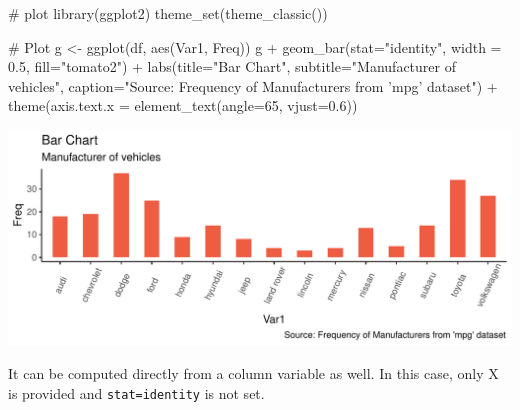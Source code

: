 \documentclass[a4paper]{article}
\newenvironment{Shaded}{}{}
\newcommand{\KeywordTok}[1]{\textcolor[rgb]{0.00,0.00,1.00}{#1}}
\newcommand{\DataTypeTok}[1]{#1}
\newcommand{\DecValTok}[1]{#1}
\newcommand{\FloatTok}[1]{#1}
\newcommand{\StringTok}[1]{\textcolor[rgb]{0.00,0.50,0.50}{#1}}
\newcommand{\CommentTok}[1]{\textcolor[rgb]{0.00,0.50,0.00}{#1}}
\newcommand{\OperatorTok}[1]{#1}
\newcommand{\NormalTok}[1]{#1}
\begin{document}
\begin{Shaded}
\begin{Highlighting}[]
\CommentTok{# plot}
\KeywordTok{library}\NormalTok{(ggplot2)}
\KeywordTok{theme_set}\NormalTok{(}\KeywordTok{theme_classic}\NormalTok{())}

\CommentTok{# Plot}
\NormalTok{g <-}\StringTok{ }\KeywordTok{ggplot}\NormalTok{(df, }\KeywordTok{aes}\NormalTok{(Var1, Freq))}
\NormalTok{g }\OperatorTok{+}\StringTok{ }\KeywordTok{geom_bar}\NormalTok{(}\DataTypeTok{stat=}\StringTok{"identity"}\NormalTok{, }\DataTypeTok{width =} \FloatTok{0.5}\NormalTok{, }\DataTypeTok{fill=}\StringTok{"tomato2"}\NormalTok{) }\OperatorTok{+}\StringTok{ }
\StringTok{      }\KeywordTok{labs}\NormalTok{(}\DataTypeTok{title=}\StringTok{"Bar Chart"}\NormalTok{, }
           \DataTypeTok{subtitle=}\StringTok{"Manufacturer of vehicles"}\NormalTok{, }
           \DataTypeTok{caption=}\StringTok{"Source: Frequency of Manufacturers from 'mpg' dataset"}\NormalTok{) }\OperatorTok{+}
\StringTok{      }\KeywordTok{theme}\NormalTok{(}\DataTypeTok{axis.text.x =} \KeywordTok{element_text}\NormalTok{(}\DataTypeTok{angle=}\DecValTok{65}\NormalTok{, }\DataTypeTok{vjust=}\FloatTok{0.6}\NormalTok{))}
\end{Highlighting}
\end{Shaded}

\includegraphics{M24-ggplot2_Gallery_files/figure-latex/unnamed-chunk-39-1.pdf}

\newpage  

It can be computed directly from a column variable as well. In this
case, only X is provided and \texttt{stat=identity} is not set.
\end{document}
